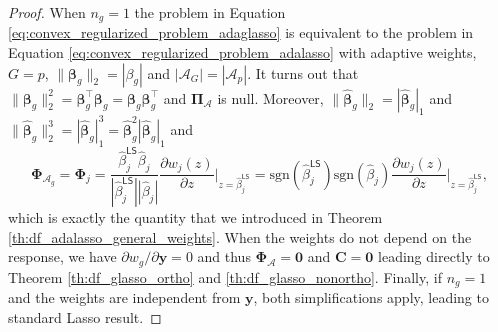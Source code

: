\documentclass[a4paper, 12pt]{article}
\newcommand{\Aset}{\mathcal{A}}
\newcommand{\T}{\top}
\def\bbeta{\boldsymbol{\beta}}
\def\bPi{\boldsymbol{\Pi}}
\def\bPhi{\boldsymbol{\Phi}}
\def\by{\boldsymbol{y}}
\def\bC{\mathbf{C}}
\def\by{\mathbf{y}}
\begin{document}
\begin{proof}
When $n_g=1$ the problem in Equation \eqref{eq:convex_regularized_problem_adaglasso} is equivalent to the problem in Equation \eqref{eq:convex_regularized_problem_adalasso} with adaptive weights, $G=p$, $\lVert \bbeta_g \rVert_2 = |\beta_g|$ and $|\Aset_G| = |\Aset_p|$. It turns out that $\lVert\bbeta_g\rVert_2^2 = \bbeta_g^{\T}\bbeta_g = \bbeta_g \bbeta_g^{\T}$ and $\bPi_\Aset$ is null. Moreover, $ \lVert \widehat{\bbeta}_g \rVert_2 = | \widehat{\bbeta}_g |_1$ and $ \lVert \widehat{\bbeta}_g \rVert_2^3 = | \widehat{\bbeta}_g |_1^3 = \widehat{\bbeta}_g^2 |\widehat{\bbeta}_g|_1$ and 
\begin{equation*}
\bPhi_{\Aset_g} = \bPhi_{j} = \frac{\widehat{\beta}_j^{\mathsf{LS}} \widehat{\beta}_j}{ |\widehat{\beta}_j^{\mathsf{LS}}| |\widehat{\beta}_j|}\frac{\partial w_j(z)}{\partial z} \bigg|_{z = \widehat{\beta}_j^\mathsf{LS}} = \text{sgn}(\widehat{\beta}_j^{\mathsf{LS}})\text{sgn}(\widehat{\beta}_j)\frac{\partial w_j(z)}{\partial z} \bigg|_{z = \widehat{\beta}_j^\mathsf{LS}},
\end{equation*}
which is exactly the quantity that we introduced in Theorem \ref{th:df_adalasso_general_weights}. When the weights do not depend on the response, we have $\partial w_g / \partial \by = 0$ and thus $\bPhi_{\Aset} = \boldsymbol{0}$ and $\bC = \boldsymbol{0}$ leading directly to Theorem \ref{th:df_glasso_ortho} and \ref{th:df_glasso_nonortho}. Finally, if $n_g=1$ and the weights are independent from $\by$, both simplifications apply, leading to standard Lasso result.
\end{proof}
\end{document}
